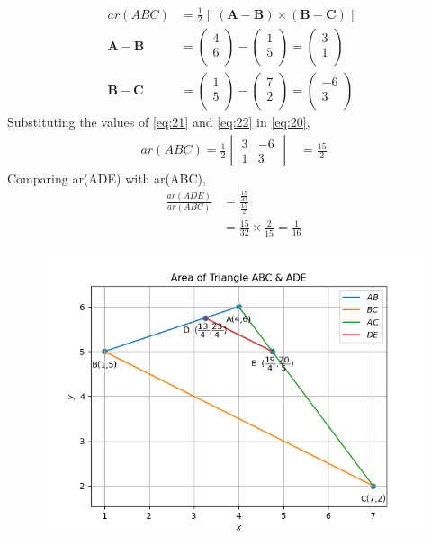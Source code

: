 \documentclass[12pt]{article}
\newcommand{\mydet}[1]{\ensuremath{\begin{vmatrix}#1\end{vmatrix}}}
\providecommand{\brak}[1]{\ensuremath{\left(#1\right)}}
\providecommand{\norm}[1]{\left\lVert#1\right\rVert}
\newcommand{\myvec}[1]{\ensuremath{\begin{pmatrix}#1\end{pmatrix}}}
\let\vec\mathbf
\begin{document}
\begin{enumerate}
\begin{align}
	  ar(ABC) &=\frac{1}{2} \norm{\brak{\vec{A}-\vec{B}}  \times 
   \brak{\vec{B}- \vec{C}}} \label{eq:20} \\
	\vec{A}- \vec{B} &= \myvec{4\\6\\}-\myvec{1\\5\\}=\myvec{3\\1\\}\label{eq:21}\\
	  \vec{B}-\vec{C} &= \myvec{1\\5\\}-\myvec{7\\2\\}=\myvec{-6\\3\\}\label{eq:22}
  \end{align}
Substituting the values of \eqref{eq:21} and \eqref{eq:22} in \eqref{eq:20},
\begin{align}
	ar(ABC)=\frac{1}{2}\mydet{3 & -6\\1 & 3}  
	&=	\frac{15}{2}
\end{align}
		Comparing ar(ADE) with ar(ABC),
\begin{align}
	\frac{ar\brak{ADE}}{ar\brak{ABC}}&=\frac{\frac{15}{32}}{\frac{15}{2}}\\
	&=\frac{15}{32}\times \frac{2}{15}=\frac{1}{16}
\end{align}

\begin{figure}[!h]
 \begin{center}
 \includegraphics[width=\columnwidth]{figs/fig.png}
 \end{center}
\caption{}
\label{fig:Fig1}
\end{figure}
\end{enumerate}
\end{document}
